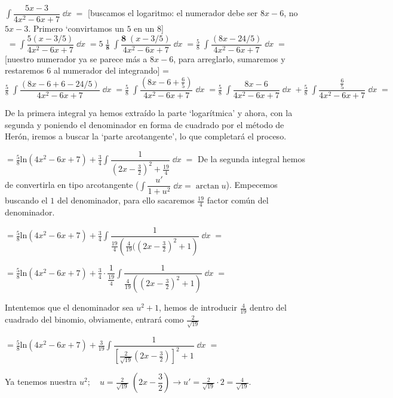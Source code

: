 {\begin{ejem}
 
 $ \displaystyle \int \dfrac {5x-3}{4x^2-6x+7} \; \dd x\; = $ [buscamos el logaritmo: el numerador debe ser $8x-6$, no $5x-3$. Primero `convirtamos un $5$ en un $8$] $\; = \displaystyle \int \dfrac {5(x-3/5)}{4x^2-6x+7} \; \dd x\; = 5\;  \frac {1} {\textbf{8}}\; \int  \dfrac {\textbf{8} \; (x-3/5)}{4x^2-6x+7} \; \dd x\; = \frac 5 8 \; \int  \dfrac  {(8x-24/5)}{4x^2-6x+7} \; \dd x\; = $ [nuestro numerador ya se parece más a $8x-6$, para arreglarlo, sumaremos y restaremos $6$ al numerador del integrando] = $ \displaystyle\frac 5 8 \; \int  \dfrac  {(8x-6 + 6 -24/5)}{4x^2-6x+7} \; \dd x\; = 
 \frac 5 8 \; \int  \dfrac  {(8x-6 + \frac 6 5)}{4x^2-6x+7} \; \dd x\; = \frac 5 8 \; \int  \dfrac  {8x-6 }{4x^2-6x+7} \; \dd x\;   +   \frac 5 8 \; \int  \dfrac  { \frac 6 5}{4x^2-6x+7} \; \dd x\; = $
 
 De la primera integral ya hemos extraído la parte `logarítmica' y ahora, con la segunda y poniendo el denominador en forma de cuadrado por el método de Herón, iremos a buscar la `parte arcotangente', lo que completará el proceso.
 
 $= \displaystyle \frac 5 8 \mathrm{ln} (4x^2-6x+7) + \frac 3 4 \int \dfrac  { 1}{(2x-\frac 3 2 )^2 + \frac {19} {4}} \; \dd x\; = $ De la segunda integral hemos de convertirla en tipo arcotangente ($\displaystyle \int \dfrac {u'}{1+u^2}\; \dd x = \arctan u$). Empecemos buscando el $1$ del denominador, para ello sacaremos $\frac {19}{4}$ factor común del denominador.
 
 $= \displaystyle \frac 5 8 \mathrm{ln} (4x^2-6x+7) + \frac 3 4 \int \dfrac  { 1} { \frac {19}{4} 
 \left( 
 \frac {4}{19}
 ((2x-\frac 3 2 )^2 + 1 
 \right)} \; \dd x\; = $
 
  $= \displaystyle \frac 5 8 \mathrm{ln} (4x^2-6x+7) + \frac 3 4 \cdot \dfrac  { 1} { \frac {19}{4}}
  \int 
  \dfrac {1} {\frac {4}{19}\left( 
 (2x-\frac 3 2 )^2 + 1 
 \right)}
  \; \dd x\; = $
  
  Intentemos que el denominador sea $u^2+1$, hemos de introducir 
  $\frac {4}{19}$ 
  dentro del cuadrado del binomio, obviamente, entrará como 
  $\frac {2}{\sqrt{19}}$
  
    $= \displaystyle \frac 5 8 \mathrm{ln} (4x^2-6x+7) + \frac {3}{19}  \int 
  \dfrac {1}{\left [ \frac {2}{\sqrt{19}} \left( 2x-\frac 3 2 \right) \right]^2 + 1  }
  \; \dd x\; = $
  
  Ya tenemos nuestra $u^2; \quad u=\displaystyle \frac {2}
 {\sqrt{19}}\; \left(2x-\dfrac 3 2 \right) \to  u'= \frac  {2}{\sqrt{19}}\cdot 2 =\frac {4}{\sqrt{19}}  $.
  

\end{ejem}}
